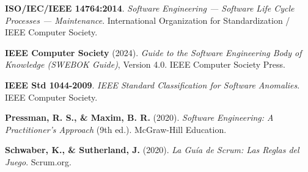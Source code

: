 \documentclass[12pt]{article}
\begin{document}
\begin{enumerate}[label={[\arabic*]}]
    \item \textbf{ISO/IEC/IEEE 14764:2014}. \textit{Software Engineering --- Software Life Cycle Processes --- Maintenance}. International Organization for Standardization / IEEE Computer Society.
    \item \textbf{IEEE Computer Society} (2024). \textit{Guide to the Software Engineering Body of Knowledge (SWEBOK Guide)}, Version 4.0. IEEE Computer Society Press.
    \item \textbf{IEEE Std 1044-2009}. \textit{IEEE Standard Classification for Software Anomalies}. IEEE Computer Society.
    \item \textbf{Pressman, R. S., \& Maxim, B. R.} (2020). \textit{Software Engineering: A Practitioner's Approach} (9th ed.). McGraw-Hill Education.
    \item \textbf{Schwaber, K., \& Sutherland, J.} (2020). \textit{La Guía de Scrum: Las Reglas del Juego}. Scrum.org.
\end{enumerate}
\end{document}
